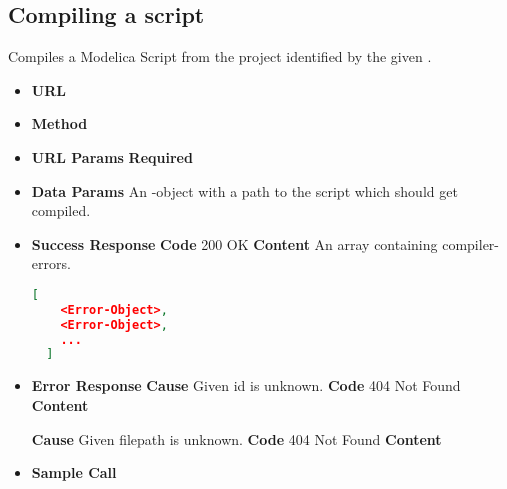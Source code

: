 \subsection{Compiling a script}
Compiles a Modelica Script from the project identified by the given .

\begin{itemize}
\item \textbf{URL} 
\item \textbf{Method} 

\item \textbf{URL Params}
  \newline\textbf{Required} 

\item \textbf{Data Params} An -object with a path to the script which
  should get compiled.

\item \textbf{Success Response}
  \newline\textbf{Code} 200 OK
  \newline\textbf{Content} An array containing compiler-errors.
  \begin{lstlisting}[basicstyle=\small,language=json]
  [
    <Error-Object>,
    <Error-Object>,
    ...
  ]
  \end{lstlisting}

\item \textbf{Error Response}
  \newline\textbf{Cause} Given id is unknown.
  \newline\textbf{Code} 404 Not Found
  \newline\textbf{Content} 

  \fixedspace\textbf{Cause} Given filepath is unknown.
  \newline\textbf{Code} 404 Not Found
  \newline\textbf{Content} 
\item \textbf{Sample Call}
\end{itemize}
